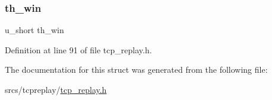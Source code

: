 \subsubsection{\texorpdfstring{th\+\_\+win}{th\_win}}
{\footnotesize\ttfamily u\+\_\+short th\+\_\+win}



Definition at line 91 of file tcp\+\_\+replay.\+h.



The documentation for this struct was generated from the following file\+:\begin{DoxyCompactItemize}
\item 
srcs/tcpreplay/\hyperlink{tcp__replay_8h}{tcp\+\_\+replay.\+h}\end{DoxyCompactItemize}
